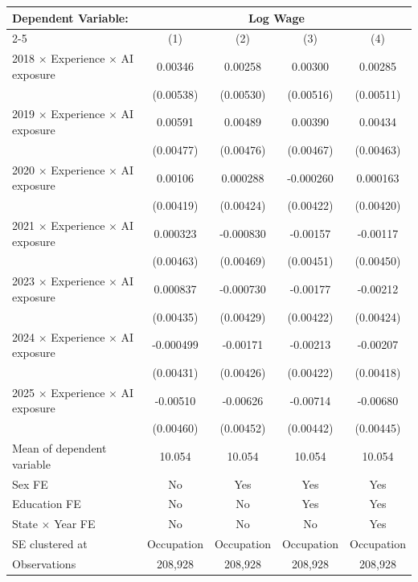 \def\sym#1{\ifmmode^{#1}\else\(^{#1}\)\fi}
\begin{tabular}{l*{4}{c}}
\toprule
Dependent Variable: & \multicolumn{4}{c}{Log Wage} \\
\cmidrule(lr){2-5}
 & (1) & (2) & (3) & (4) \\
\midrule
2018 $\times$ Experience $\times$ AI exposure&     0.00346   &     0.00258   &     0.00300   &     0.00285   \\
            &   (0.00538)   &   (0.00530)   &   (0.00516)   &   (0.00511)   \\
2019 $\times$ Experience $\times$ AI exposure&     0.00591   &     0.00489   &     0.00390   &     0.00434   \\
            &   (0.00477)   &   (0.00476)   &   (0.00467)   &   (0.00463)   \\
2020 $\times$ Experience $\times$ AI exposure&     0.00106   &    0.000288   &   -0.000260   &    0.000163   \\
            &   (0.00419)   &   (0.00424)   &   (0.00422)   &   (0.00420)   \\
2021 $\times$ Experience $\times$ AI exposure&    0.000323   &   -0.000830   &    -0.00157   &    -0.00117   \\
            &   (0.00463)   &   (0.00469)   &   (0.00451)   &   (0.00450)   \\
2023 $\times$ Experience $\times$ AI exposure&    0.000837   &   -0.000730   &    -0.00177   &    -0.00212   \\
            &   (0.00435)   &   (0.00429)   &   (0.00422)   &   (0.00424)   \\
2024 $\times$ Experience $\times$ AI exposure&   -0.000499   &    -0.00171   &    -0.00213   &    -0.00207   \\
            &   (0.00431)   &   (0.00426)   &   (0.00422)   &   (0.00418)   \\
2025 $\times$ Experience $\times$ AI exposure&    -0.00510   &    -0.00626   &    -0.00714   &    -0.00680   \\
            &   (0.00460)   &   (0.00452)   &   (0.00442)   &   (0.00445)   \\
\midrule
Mean of dependent variable&      10.054   &      10.054   &      10.054   &      10.054   \\
Sex FE      &          No   &         Yes   &         Yes   &         Yes   \\
Education FE&          No   &          No   &         Yes   &         Yes   \\
State $\times$ Year FE&          No   &          No   &          No   &         Yes   \\
SE clustered at&  Occupation   &  Occupation   &  Occupation   &  Occupation   \\
Observations&     208,928   &     208,928   &     208,928   &     208,928   \\
\bottomrule
\end{tabular}
